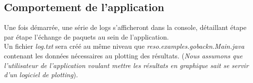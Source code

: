 \documentclass[]{article}
\begin{document}
\subsection{Comportement de l'application}
Une fois démarrée, une série de logs s'afficheront dans la console, détaillant étape par étape l'échange de paquets au sein de l'application.\\
Un fichier \emph{log.txt} sera créé au même niveau que \emph{reso.examples.gobackn.Main.java} contenant les données nécessaires au plotting des résultats.
(\emph{Nous assumons que l'utilisateur de l'application voulant mettre les résultats en graphique sait se servir d'un logiciel de plotting}).
\end{document}
